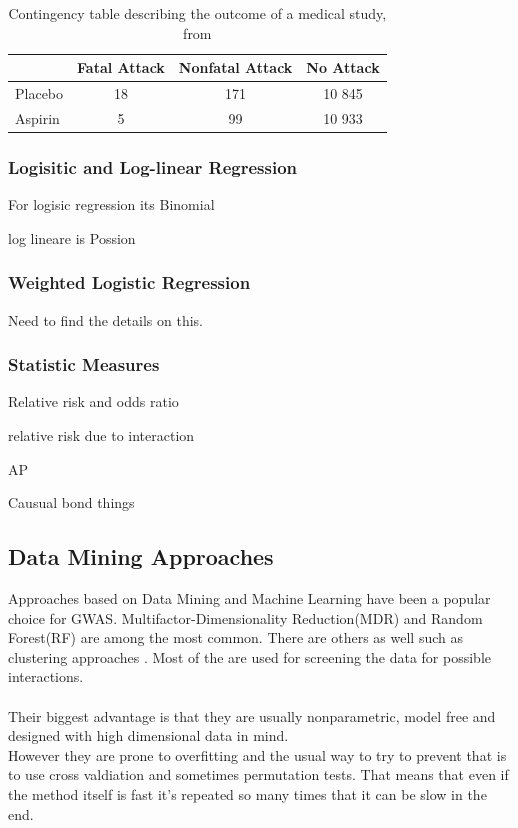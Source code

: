 \documentclass[10pt,a4paper]{article}
\begin{document}
\begin{table}[h]
\begin{tabular}{ l c c c }
  \hline
  & Fatal Attack & Nonfatal Attack & No Attack\\
  \hline
  Placebo & 18 & 171 & 10 845 \\
  Aspirin & 5 & 99 & 10 933 \\
  \hline  
\end{tabular}
\caption{Contingency table describing the outcome of a medical study, from \cite{agresti_categorical}}
\label{table:contingency_table}
\end{table}

\subsubsection{Logisitic and Log-linear Regression}
For logisic regression its Binomial\cite{agresti_categorical}

log lineare is Possion\cite{agresti_categorical}

\subsubsection{Weighted Logistic Regression}
Need to find the details on this.

\subsubsection{Statistic Measures}
Relative risk and odds ratio\cite{agresti_categorical}

relative risk due to interaction

AP

Causual bond things

\subsection{Data Mining Approaches}
Approaches based on Data Mining and Machine Learning have been a popular choice for GWAS. Multifactor-Dimensionality Reduction(MDR)\cite{mdr_2001} and Random Forest(RF)\cite{random_forest} are among the most common\cite{gene_enviroment_2013,cordell_detect_review}. There are others as well such as clustering approaches \cite{fast_high_order_cluster}. Most of the are used for screening the data for possible interactions\cite{gene_enviroment_2013,cordell_detect_review}.\\
\\
Their biggest advantage is that they are usually nonparametric, model free and designed with high dimensional data in mind.
\\
However they are prone to overfitting and the usual way to try to prevent that is to use cross valdiation and sometimes permutation tests. That means that even if the method itself is fast it's repeated so many times that it can be slow in the end\cite{cordell_detect_review}.
\end{document}
